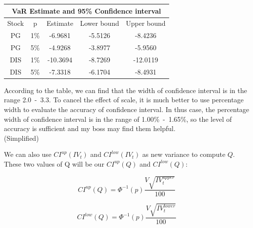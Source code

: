 \documentclass[12pt,letterpaper]{article}
\begin{document}
\begin{enumerate}[label=\textbf{(\Alph*)}]
\begin{enumerate}[label=(\roman*)]
\begin{table}[ht]
\centering %
\begin{tabular}{ccccc} %
\hline\hline %
\multicolumn{5}{c}{VaR Estimate and 95\% Confidence interval}\\
\hline Stock & p & Estimate & Lower bound & Upper bound\\
\hline %
PG & 1\% & -6.9681 & -5.5126 & -8.4236 \\ %
PG & 5\% & -4.9268 & -3.8977 & -5.9560 \\ %
DIS & 1\% & -10.3694 & -8.7269 & -12.0119 \\ %
DIS & 5\% &-7.3318 & -6.1704 & -8.4931\\
\hline %
\end{tabular}
\end{table}
\newpage
According to the table, we can find that the width of confidence interval is in the range 2.0~-~3.3. To cancel the effect of scale, it is much better to use percentage width to evaluate the accuracy of confidence interval. In thus case, the percentage width of confidence interval is in the range of 1.00\%~-~1.65\%, so the level of accuracy is sufficient and my boss may find them helpful.\\
    
(Simplified) 

We can also use $CI^{up}(IV_t)$ and $CI^{low}(IV_t)$ as new variance to compute $Q$. These two values of Q will be our $CI^{up}(Q)$ and $CI^{low}(Q)$:

\vspace{-3mm}

$$CI^{up}(Q)=\Phi^{-1}(p)\frac{V\sqrt{IV_t^{upper}}}{100}$$

\vspace{-3mm}

$$CI^{low}(Q)=\Phi^{-1}(p)\frac{V\sqrt{IV_t^{lower}}}{100}$$





\end{enumerate}
\end{enumerate}
\end{document}

